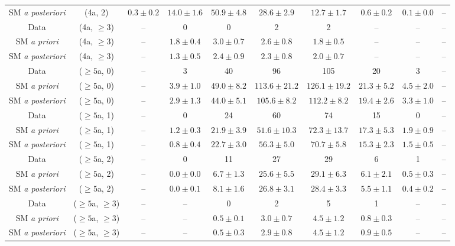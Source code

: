 \begin{table}[h!]
{\begin{tabular}{cccccccccc}
	SM \textit{a posteriori} & (4a, 2) & $0.3\pm 0.2$ & $14.0\pm 1.6$ & $50.9\pm 4.8$ & $28.6\pm 2.9$ & $12.7\pm 1.7$ & $0.6\pm 0.2$ & $0.1\pm 0.0$ & -- \\[0.5ex] 
	Data & (4a, $\ge3$) & -- & 0 & 0 & 2 & 2 & -- & -- & -- \\[0.5ex] 
	SM \textit{a priori} & (4a, $\ge3$) & -- & $1.8\pm 0.4$ & $3.0\pm 0.7$ & $2.6\pm 0.8$ & $1.8\pm 0.5$ & -- & -- & -- \\[0.5ex] 
	SM \textit{a posteriori} & (4a, $\ge3$) & -- & $1.3\pm 0.5$ & $2.4\pm 0.9$ & $2.3\pm 0.8$ & $2.0\pm 0.7$ & -- & -- & -- \\[0.5ex] 
	Data & ($\ge5$a, 0) & -- & 3 & 40 & 96 & 105 & 20 & 3 & -- \\[0.5ex] 
	SM \textit{a priori} & ($\ge5$a, 0) & -- & $3.9\pm 1.0$ & $49.0\pm 8.2$ & $113.6\pm 21.2$ & $126.1\pm 19.2$ & $21.3\pm 5.2$ & $4.5\pm 2.0$ & -- \\[0.5ex] 
	SM \textit{a posteriori} & ($\ge5$a, 0) & -- & $2.9\pm 1.3$ & $44.0\pm 5.1$ & $105.6\pm 8.2$ & $112.2\pm 8.2$ & $19.4\pm 2.6$ & $3.3\pm 1.0$ & -- \\[0.5ex] 
	Data & ($\ge5$a, 1) & -- & 0 & 24 & 60 & 74 & 15 & 0 & -- \\[0.5ex] 
	SM \textit{a priori} & ($\ge5$a, 1) & -- & $1.2\pm 0.3$ & $21.9\pm 3.9$ & $51.6\pm 10.3$ & $72.3\pm 13.7$ & $17.3\pm 5.3$ & $1.9\pm 0.9$ & -- \\[0.5ex] 
	SM \textit{a posteriori} & ($\ge5$a, 1) & -- & $0.8\pm 0.4$ & $22.7\pm 3.0$ & $56.3\pm 5.0$ & $70.7\pm 5.8$ & $15.3\pm 2.3$ & $1.5\pm 0.5$ & -- \\[0.5ex] 
	Data & ($\ge5$a, 2) & -- & 0 & 11 & 27 & 29 & 6 & 1 & -- \\[0.5ex] 
	SM \textit{a priori} & ($\ge5$a, 2) & -- & $0.0\pm 0.0$ & $6.7\pm 1.3$ & $25.6\pm 5.5$ & $29.1\pm 6.3$ & $6.1\pm 2.1$ & $0.5\pm 0.3$ & -- \\[0.5ex] 
	SM \textit{a posteriori} & ($\ge5$a, 2) & -- & $0.0\pm 0.1$ & $8.1\pm 1.6$ & $26.8\pm 3.1$ & $28.4\pm 3.3$ & $5.5\pm 1.1$ & $0.4\pm 0.2$ & -- \\[0.5ex] 
	Data & ($\ge5$a, $\ge3$) & -- & -- & 0 & 2 & 5 & 1 & -- & -- \\[0.5ex] 
	SM \textit{a priori} & ($\ge5$a, $\ge3$) & -- & -- & $0.5\pm 0.1$ & $3.0\pm 0.7$ & $4.5\pm 1.2$ & $0.8\pm 0.3$ & -- & -- \\[0.5ex] 
	SM \textit{a posteriori} & ($\ge5$a, $\ge3$) & -- & -- & $0.5\pm 0.3$ & $2.9\pm 0.8$ & $4.5\pm 1.2$ & $0.9\pm 0.5$ & -- & -- \\[0.5ex] 
	\hline
	\hline
\end{tabular}}
\end{table}
